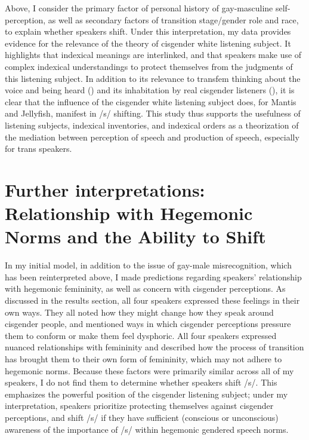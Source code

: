 \documentclass[12pt,twoside]{reedthesis}
\begin{document}
Above, I consider the primary factor of personal history of gay-masculine self-perception, as well as secondary factors of transition stage/gender role and race, to explain whether speakers shift. Under this interpretation, my data provides evidence for the relevance of the theory of cisgender white listening subject. It highlights that indexical meanings are interlinked, and that speakers make use of complex indexical understandings to protect themselves from the judgments of this listening subject. In addition to its relevance to transfem thinking about the voice and being heard (\cite{heffernan_constructing_2023}) and its inhabitation by real cisgender listeners (\cite{jessee_cisgender_2025}), it is clear that the influence of the cisgender white listening subject does, for Mantis and Jellyfish, manifest in /s/ shifting. This study thus supports the usefulness of listening subjects, indexical inventories, and indexical orders as a theorization of the mediation between perception of speech and production of speech, especially for trans speakers.

\section{Further interpretations: Relationship with Hegemonic Norms and the Ability to Shift}

In my initial model, in addition to the issue of gay-male misrecognition, which has been reinterpreted above, I made predictions regarding speakers' relationship with hegemonic femininity, as well as concern with cisgender perceptions. As discussed in the results section, all four speakers expressed these feelings in their own ways. They all noted how they might change how they speak around cisgender people, and mentioned ways in which cisgender perceptions pressure them to conform or make them feel dysphoric. All four speakers expressed nuanced relationships with femininity and described how the process of transition has brought them to their own form of femininity, which may not adhere to hegemonic norms. Because these factors were primarily similar across all of my speakers, I do not find them to determine whether speakers shift /s/. This emphasizes the powerful position of the cisgender listening subject; under my interpretation, speakers prioritize protecting themselves against cisgender perceptions, and shift /s/ if they have sufficient (conscious or unconscious) awareness of the importance of /s/ within hegemonic gendered speech norms.
\end{document}
